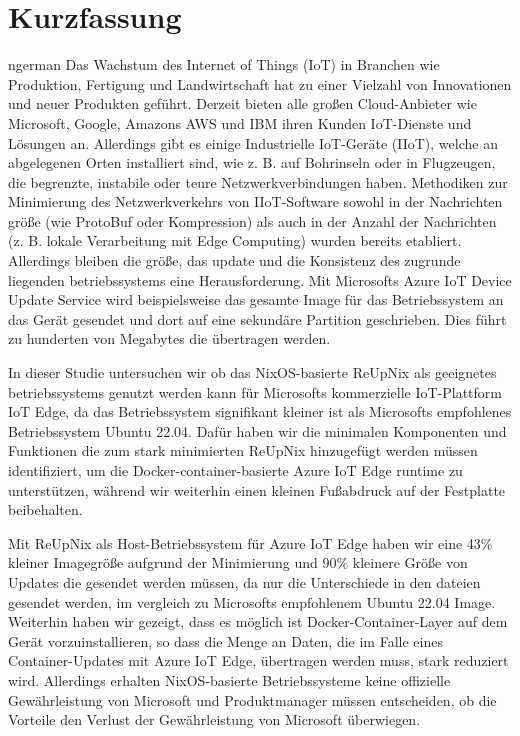 \chapter*{Kurzfassung}
\begin{otherlanguage*}{ngerman}
Das Wachstum des Internet of Things (IoT) in Branchen wie Produktion, Fertigung
und Landwirtschaft hat zu einer Vielzahl von Innovationen und neuer Produkten geführt.
Derzeit bieten alle großen Cloud-Anbieter wie Microsoft, Google, Amazons AWS und IBM
ihren Kunden IoT-Dienste und Lösungen an.
Allerdings gibt es einige Industrielle IoT-Geräte (IIoT), welche
 an abgelegenen Orten installiert sind, wie z. B. auf Bohrinseln oder in Flugzeugen,
die begrenzte, instabile oder teure Netzwerkverbindungen haben.
Methodiken zur Minimierung des Netzwerkverkehrs von IIoT-Software sowohl in der
Nachrichten größe (wie ProtoBuf oder  Kompression) als auch in der Anzahl der Nachrichten
(z. B. lokale Verarbeitung mit Edge Computing) wurden bereits etabliert.
Allerdings bleiben die größe, das update und die Konsistenz des zugrunde liegenden
betriebssystems eine Herausforderung. Mit Microsofts Azure IoT Device Update Service
wird beispielsweise das gesamte Image für das Betriebssystem an das Gerät gesendet
und dort auf eine sekundäre Partition geschrieben. Dies führt zu hunderten von Megabytes
die übertragen werden.

In dieser Studie untersuchen wir ob das NixOS-basierte ReUpNix als geeignetes
betriebssystems genutzt werden kann für Microsofts kommerzielle IoT-Plattform
IoT Edge, da das Betriebssystem signifikant kleiner ist als Microsofts empfohlenes
Betriebssystem Ubuntu 22.04. Dafür haben wir die minimalen Komponenten und Funktionen
die zum stark minimierten ReUpNix hinzugefügt werden müssen identifiziert, um die
Docker-container-basierte Azure IoT Edge runtime zu unterstützen, während wir
weiterhin einen kleinen Fußabdruck auf der Festplatte beibehalten.

Mit ReUpNix als Host-Betriebssystem für Azure IoT Edge haben wir eine 43\%
kleiner Imagegröße aufgrund der Minimierung und 90\% kleinere Größe von
Updates die gesendet werden müssen, da nur die Unterschiede in den dateien gesendet
werden, im vergleich zu Microsofts empfohlenem Ubuntu 22.04 Image. Weiterhin haben
wir gezeigt, dass es möglich ist Docker-Container-Layer auf dem Gerät vorzuinstallieren,
so dass die Menge an Daten, die im Falle eines Container-Updates mit Azure IoT Edge,
übertragen werden muss, stark reduziert wird. Allerdings erhalten NixOS-basierte
Betriebssysteme keine offizielle Gewährleistung von Microsoft und Produktmanager
müssen entscheiden, ob die Vorteile den Verlust der Gewährleistung von Microsoft überwiegen.

\end{otherlanguage*}

